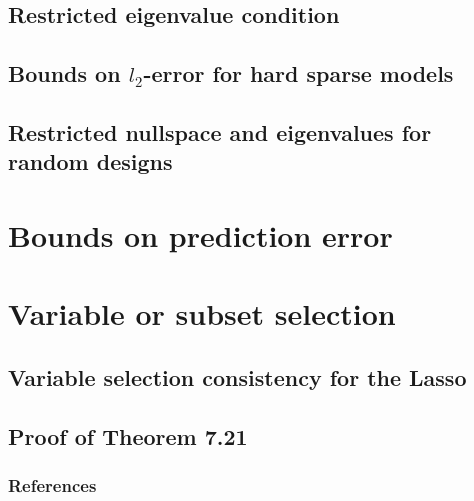 \documentclass[10pt,handout,english]{beamer}
\begin{document}
\subsection{Restricted eigenvalue condition}

\subsection{Bounds on $l_2$-error for hard sparse models}
\frame{\tableofcontents[currentsection]}

\subsection{Restricted nullspace and eigenvalues for random designs}
\frame{\tableofcontents[currentsection]}

\section{Bounds on prediction error}
\frame{\tableofcontents[currentsection]}

\section{Variable or subset selection}
\subsection{Variable selection consistency for the Lasso}
\frame{\tableofcontents[currentsection]}

\subsection{Proof of Theorem 7.21}
\frame{\tableofcontents[currentsection]}


\begin{frame}[allowframebreaks]
\frametitle{References}


\end{frame}
\end{document}
